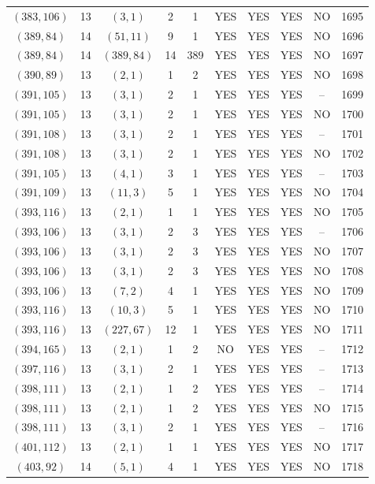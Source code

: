 \begin{longtable}{|c|c|c|c|c|c|c|c|c|c|}
$(383, 106)$ & 13 & $(3, 1)$ & 2 & 1 & YES & YES & YES & NO & 1695\\
$(389, 84)$ & 14 & $(51, 11)$ & 9 & 1 & YES & YES & YES & NO & 1696\\
$(389, 84)$ & 14 & $(389, 84)$ & 14 & 389 & YES & YES & YES & NO & 1697\\
$(390, 89)$ & 13 & $(2, 1)$ & 1 & 2 & YES & YES & YES & NO & 1698\\
$(391, 105)$ & 13 & $(3, 1)$ & 2 & 1 & YES & YES & YES & -- & 1699\\
$(391, 105)$ & 13 & $(3, 1)$ & 2 & 1 & YES & YES & YES & NO & 1700\\
$(391, 108)$ & 13 & $(3, 1)$ & 2 & 1 & YES & YES & YES & -- & 1701\\
$(391, 108)$ & 13 & $(3, 1)$ & 2 & 1 & YES & YES & YES & NO & 1702\\
$(391, 105)$ & 13 & $(4, 1)$ & 3 & 1 & YES & YES & YES & -- & 1703\\
$(391, 109)$ & 13 & $(11, 3)$ & 5 & 1 & YES & YES & YES & NO & 1704\\
$(393, 116)$ & 13 & $(2, 1)$ & 1 & 1 & YES & YES & YES & NO & 1705\\
$(393, 106)$ & 13 & $(3, 1)$ & 2 & 3 & YES & YES & YES & -- & 1706\\
$(393, 106)$ & 13 & $(3, 1)$ & 2 & 3 & YES & YES & YES & NO & 1707\\
$(393, 106)$ & 13 & $(3, 1)$ & 2 & 3 & YES & YES & YES & NO & 1708\\
$(393, 106)$ & 13 & $(7, 2)$ & 4 & 1 & YES & YES & YES & NO & 1709\\
$(393, 116)$ & 13 & $(10, 3)$ & 5 & 1 & YES & YES & YES & NO & 1710\\
$(393, 116)$ & 13 & $(227, 67)$ & 12 & 1 & YES & YES & YES & NO & 1711\\
$(394, 165)$ & 13 & $(2, 1)$ & 1 & 2 & NO & YES & YES & -- & 1712\\
$(397, 116)$ & 13 & $(3, 1)$ & 2 & 1 & YES & YES & YES & -- & 1713\\
$(398, 111)$ & 13 & $(2, 1)$ & 1 & 2 & YES & YES & YES & -- & 1714\\
$(398, 111)$ & 13 & $(2, 1)$ & 1 & 2 & YES & YES & YES & NO & 1715\\
$(398, 111)$ & 13 & $(3, 1)$ & 2 & 1 & YES & YES & YES & -- & 1716\\
$(401, 112)$ & 13 & $(2, 1)$ & 1 & 1 & YES & YES & YES & NO & 1717\\
$(403, 92)$ & 14 & $(5, 1)$ & 4 & 1 & YES & YES & YES & NO & 1718\\

\end{longtable}
